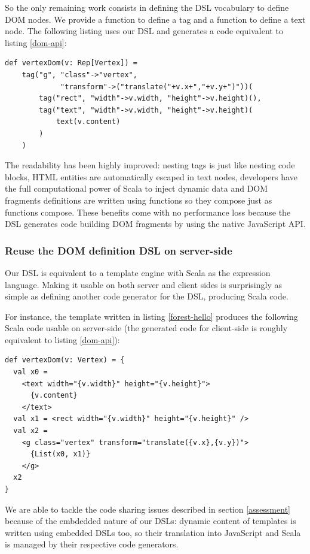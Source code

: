 \documentclass[american,english,runningheads]{llncs}
\begin{document}
So the only remaining work consists in defining the DSL vocabulary to define DOM nodes. We provide a 
function to define a tag and a  function to define a text node. The following listing uses our DSL and
generates a code equivalent to listing \ref{dom-api}:

\begin{lstlisting}[label=forest-hello,caption=DOM definition DSL]
def vertexDom(v: Rep[Vertex]) =
    tag("g", "class"->"vertex",
             "transform"->("translate("+v.x+","+v.y+")"))(
        tag("rect", "width"->v.width, "height"->v.height)(),
        tag("text", "width"->v.width, "height"->v.height)(
            text(v.content)
        )
    )
\end{lstlisting}

The readability has been highly improved: nesting tags is just like nesting code blocks, HTML entities are
automatically escaped in text nodes, developers have the full computational power of Scala to inject dynamic data and
DOM fragments definitions are written using functions so they compose just as functions compose. These benefits come
with no performance loss because the DSL generates code building DOM fragments by using the native JavaScript API.

\subsubsection{Reuse the DOM definition DSL on server-side}

Our DSL is equivalent to a template engine with Scala as the expression language. Making it usable on both server and
client sides is surprisingly as simple as defining another code generator for the DSL, producing Scala code.

For instance, the template written in listing \ref{forest-hello} produces the following Scala code usable on
server-side (the generated code for client-side is roughly equivalent to listing \ref{dom-api}):

\begin{lstlisting}
def vertexDom(v: Vertex) = {
  val x0 =
    <text width="{v.width}" height="{v.height}">
      {v.content}
    </text>
  val x1 = <rect width="{v.width}" height="{v.height}" />
  val x2 =
    <g class="vertex" transform="translate({v.x},{v.y})">
      {List(x0, x1)}
    </g>
  x2
}
\end{lstlisting}

We are able to tackle the code sharing issues described in section \ref{assessment} because of the embdedded nature
of our DSLs: dynamic content of templates is written using embedded DSLs too, so their translation into JavaScript
and Scala is managed by their respective code generators.
\end{document}
